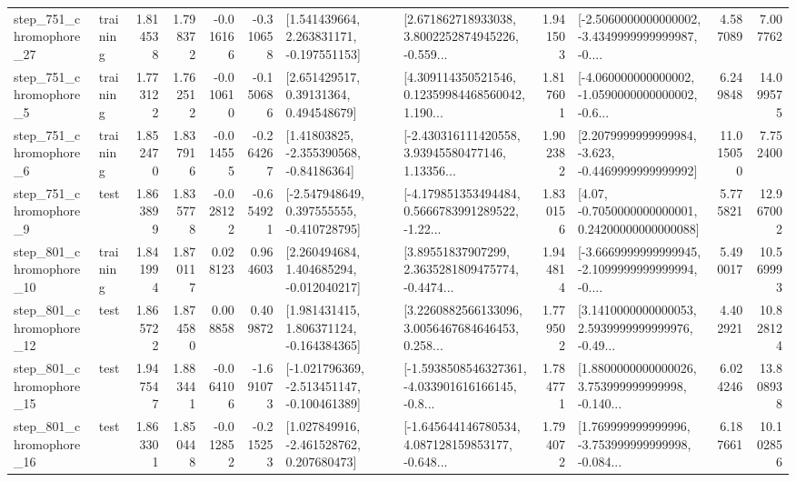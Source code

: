 \begin{tabular}{llrrrrllrlrr}
  step\_751\_chromophore\_27 &  training &      1.814538 &    1.798372 &     -0.016166 & -0.310658 &    [1.541439664, 2.263831171, -0.197551153] &  [2.671862718933038, 3.8002252874945226, -0.559... &       1.941503 &  [-2.5060000000000002, -3.4349999999999987, -0.... &            4.587089 &          7.007762 \\
   step\_751\_chromophore\_5 &  training &      1.773122 &    1.762512 &     -0.010610 & -0.150686 &      [2.651429517, 0.39131364, 0.494548679] &  [4.309114350521546, 0.12359984468560042, 1.190... &       1.817601 &  [-4.060000000000002, -1.0590000000000002, -0.6... &            6.249848 &         14.099575 \\
   step\_751\_chromophore\_6 &  training &      1.852470 &    1.837916 &     -0.014555 & -0.264267 &     [1.41803825, -2.355390568, -0.84186364] &  [-2.430316111420558, 3.93945580477146, 1.13356... &       1.902382 &  [2.2079999999999984, -3.623, -0.4469999999999992] &           11.015050 &          7.752400 \\
   step\_751\_chromophore\_9 &      test &      1.863899 &    1.835778 &     -0.028122 & -0.654921 &   [-2.547948649, 0.397555555, -0.410728795] &  [-4.179851353494484, 0.5666783991289522, -1.22... &       1.830156 &   [4.07, -0.7050000000000001, 0.24200000000000088] &            5.775821 &         12.967002 \\
  step\_801\_chromophore\_10 &  training &      1.841994 &    1.870117 &      0.028123 &  0.964603 &    [2.260494684, 1.404685294, -0.012040217] &  [3.89551837907299, 2.3635281809475774, -0.4474... &       1.944814 &  [-3.6669999999999945, -2.1099999999999994, -0.... &            5.490017 &         10.569993 \\
  step\_801\_chromophore\_12 &      test &      1.865722 &    1.874580 &      0.008858 &  0.409872 &    [1.981431415, 1.806371124, -0.164384365] &  [3.2260882566133096, 3.0056467684646453, 0.258... &       1.779502 &  [3.1410000000000053, 2.5939999999999976, -0.49... &            4.402921 &         10.828124 \\
  step\_801\_chromophore\_15 &      test &      1.947547 &    1.883441 &     -0.064106 & -1.691073 &  [-1.021796369, -2.513451147, -0.100461389] &  [-1.5938508546327361, -4.033901616166145, -0.8... &       1.784771 &  [1.8800000000000026, 3.753999999999998, -0.140... &            6.024246 &         13.808938 \\
  step\_801\_chromophore\_16 &      test &      1.863301 &    1.850448 &     -0.012852 & -0.215253 &    [1.027849916, -2.461528762, 0.207680473] &  [-1.645644146780534, 4.087128159853177, -0.648... &       1.794072 &  [1.769999999999996, -3.753999999999998, -0.084... &            6.187661 &         10.102856 \\

\end{tabular}
